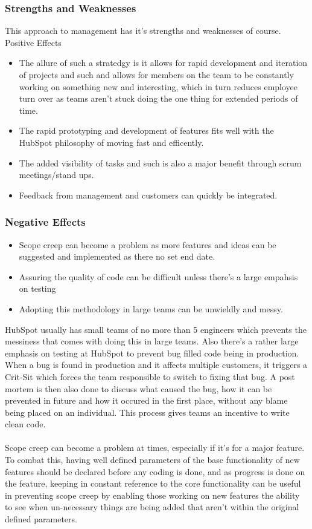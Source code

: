 \documentclass[11pt]{article} %
\begin{document}
\subsubsection{\textbf {Strengths and Weaknesses}}
This approach to management has it's strengths and weaknesses of course.
\\
Positive Effects \begin{itemize} 
\item The allure of such a stratedgy is it allows for rapid development and iteration of projects and such and allows for members on the team to be constantly working on something new and interesting, which in turn reduces employee turn over as teams aren't stuck doing the one thing for extended periods of time. 
\item The rapid prototyping and development of features fits well with the HubSpot philosophy of moving fast and efficently. 
\item The added visibility of tasks and such is also a major benefit through scrum meetings/stand ups. 
\item Feedback from management and customers can quickly be integrated.
\end{itemize}  

\subsubsection{\textbf{Negative Effects}}
 \begin{itemize}
 \item Scope creep can become a problem as more features and ideas can be suggested and implemented as there no set end date.
 \item Assuring the quality of code can be difficult unless there's a large empahsis on testing
 \item Adopting this methodology in large teams can be unwieldly and messy.
\end{itemize}
HubSpot usually has small teams of no more than 5 engineers which prevents the messiness that comes with doing this in large teams. Also there's a rather large emphasis on testing at HubSpot to prevent bug filled code being in production. When a bug is found in production and it affects multiple customers, it triggers a Crit-Sit which forces the team responsible to switch to fixing that bug. A post mortem is then also done to discuss what caused the bug, how it can be prevented in future and how it occured in the first place, without any blame being placed on an individual. This process gives teams an incentive to write clean code. \\\\Scope creep can become a problem at times, especially if it's for a major feature. To combat this, having well defined parameters of the base functionality of new features should be declared before any coding is done, and as progress is done on the feature, keeping in constant reference to the core functionality can be useful in preventing scope creep by enabling those working on new features the ability to see when un-necessary things are being added that aren't within the original defined parameters.
\end{document}
